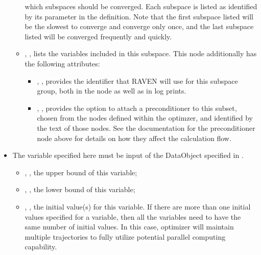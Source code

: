 \begin{itemize}
\begin{itemize}
            which subspaces should be converged.  Each subspace is listed as identified by its 
            parameter in the  definition.  Note that the first subspace listed will be the
            slowest to converge and converge only once, and the last subspace listed will be converged
            frequently and quickly.
          \item {}, , lists the variables
            included in this subspace.  This node additionally has the following attributes:
            \begin{itemize}
              \item {}, , provides the identifier that RAVEN
                will use for this subspace group, both in the  node as well as in log
                prints.
              \item {}, , provides the option to attach
                a preconditioner to this subset, chosen from the  nodes defined within
                the optimzer, and identified by the text of those nodes.  See the documentation for the
                preconditioner node above for details on how they affect the calculation flow.
            \end{itemize}
        \end{itemize}

\end{itemize}
\begin{itemize}
\item \variableDescription
 The variable specified here must be input of the DataObject specified in .
 \variableChildrenIntro
 \begin{itemize}
    \item {}, , the upper bound of this variable;
    \item {}, , the lower bound of this variable;
    \item {}, , the initial value(s) for this variable. If there are more
    than one initial values specified for a variable, then all the variables need to have the same number of initial values. In this case,
     optimizer will maintain multiple trajectories to fully utilize potential parallel computing capability.
  \end{itemize}
\end{itemize}
